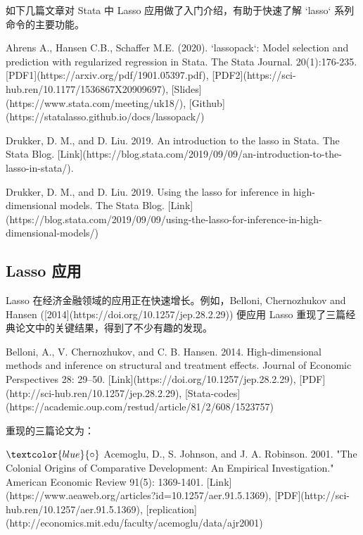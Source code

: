 {\vspace{5pt}
如下几篇文章对 Stata 中 Lasso 应用做了入门介绍，有助于快速了解 `lasso` 系列命令的主要功能。

Ahrens A., Hansen C.B., Schaffer M.E. (2020). `lassopack`: Model selection and prediction with regularized regression in Stata. The Stata Journal. 20(1):176-235. [PDF1](https://arxiv.org/pdf/1901.05397.pdf), [PDF2](https://sci-hub.ren/10.1177/1536867X20909697), [Slides](https://www.stata.com/meeting/uk18/), [Github](https://statalasso.github.io/docs/lassopack/)

Drukker, D. M., and D. Liu. 2019. An introduction to the lasso in Stata. The Stata Blog.
[Link](https://blog.stata.com/2019/09/09/an-introduction-to-the-lasso-in-stata/).

Drukker, D. M., and D. Liu. 2019. Using the lasso for inference in high-dimensional models. The Stata Blog.
[Link](https://blog.stata.com/2019/09/09/using-the-lasso-for-inference-in-high-dimensional-models/)




\subsection{Lasso 应用}

Lasso 在经济金融领域的应用正在快速增长。例如，Belloni, Chernozhukov and Hansen ([2014](https://doi.org/10.1257/jep.28.2.29)) 便应用 Lasso 重现了三篇经典论文中的关键结果，得到了不少有趣的发现。

Belloni, A., V. Chernozhukov, and C. B. Hansen. 2014. 
High-dimensional methods and inference on structural and treatment effects. 
Journal of Economic Perspectives 28: 29–50. [Link](https://doi.org/10.1257/jep.28.2.29), [PDF](http://sci-hub.ren/10.1257/jep.28.2.29), [Stata-codes](https://academic.oup.com/restud/article/81/2/608/1523757)
\vspace{3pt}

重现的三篇论文为：

\vspace{3pt}
$\textcolor{blue}{\circ}$ 
Acemoglu, D., S. Johnson, and J. A. Robinson. 2001. "The Colonial Origins of Comparative Development: An Empirical Investigation." American Economic Review 91(5): 1369-1401. [Link](https://www.aeaweb.org/articles?id=10.1257/aer.91.5.1369),  [PDF](http://sci-hub.ren/10.1257/aer.91.5.1369), [replication](http://economics.mit.edu/faculty/acemoglu/data/ajr2001)

}
